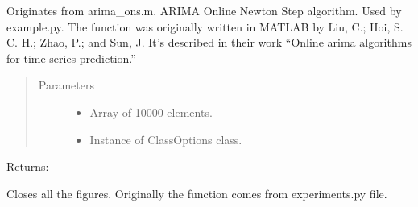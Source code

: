 \documentclass[letterpaper,10pt,english]{sphinxmanual}
\begin{document}
\begin{fulllineitems}
\label{\detokenize{LDS:LDS.OnlineLDS_library.arima_ons}}
\sphinxAtStartPar
Originates from arima\_ons.m. ARIMA Online Newton Step algorithm.
Used by example.py.
The function was originally written in MATLAB by Liu, C.; Hoi, S. C. H.; Zhao, P.; and Sun, J.
It’s described in their work “Online arima algorithms for time series prediction.”
\begin{quote}\begin{description}
\item[{Parameters}] \leavevmode\begin{itemize}
\item {} 
\sphinxAtStartPar
{} \textendash{} Array of 10000 elements.

\item {} 
\sphinxAtStartPar
{} \textendash{} Instance of ClassOptions class.

\end{itemize}

\end{description}\end{quote}

\sphinxAtStartPar
Returns:

\end{fulllineitems}


\begin{fulllineitems}
\label{\detokenize{LDS:LDS.OnlineLDS_library.close_all_figs}}
\sphinxAtStartPar
Closes all the figures. Originally the function comes from experiments.py file.

\end{fulllineitems}

\end{document}
